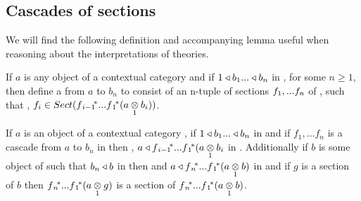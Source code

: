 \subsection{Cascades of sections}

We will find the following definition and accompanying lemma useful when reasoning about the interpretations of theories. 
\begin{definition}
If $a$ is any object of a contextual category \catcw and if $1 \base b_1 ... \base b_n$ in \catc, for some $n \ge 1$, 
then define a  from $a$ to $b_n$ to consist of an n-tuple of sections $\fn$ of \catc, such that \foreachi, 
$f_i \in Sect(\fipvectorstar(\crossx{a}{b_i}{1}))$.
\end{definition}

\begin{lemma}
If $a$ is an object of a contextual category \catc, if $1 \base b_1 ... \base b_n$ in \catc and if $f_1,...f_n$ is a cascade from $a$ to $b_n$ in  \catcw then \foreachi, $a \base \fipvectorstar(\crossx{a}{b_i}{1}$ in \catc.
Additionally if $b$ is some object of \catcw such that $b_n \base b$ in \catcw then and $a \base \fnvectorstar(\crossx{a}{b}{1})$ in \catc and
if $g$ is a section of $b$ then $\fnvectorstar(\crossx{a}{g}{1})$ is a section of $\fnvectorstar(\crossx{a}{b}{1})$.
\end{lemma}
